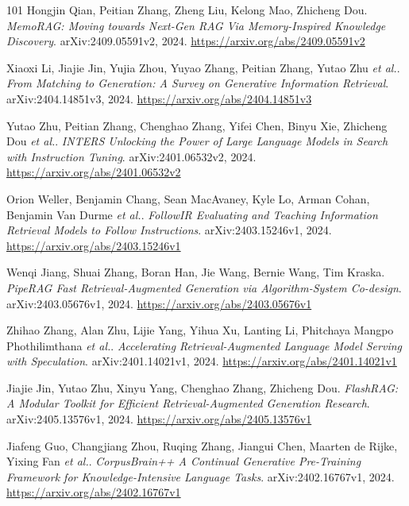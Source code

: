 \documentclass[11pt,a4paper]{article}
\begin{document}
\begin{thebibliography}{101}
Hongjin Qian, Peitian Zhang, Zheng Liu, Kelong Mao, Zhicheng Dou.
\newblock \emph{MemoRAG: Moving towards Next-Gen RAG Via Memory-Inspired Knowledge Discovery}.
\newblock arXiv:2409.05591v2, 2024.
\newblock \url{https://arxiv.org/abs/2409.05591v2}

Xiaoxi Li, Jiajie Jin, Yujia Zhou, Yuyao Zhang, Peitian Zhang, Yutao Zhu \emph{et al.}.
\newblock \emph{From Matching to Generation: A Survey on Generative Information Retrieval}.
\newblock arXiv:2404.14851v3, 2024.
\newblock \url{https://arxiv.org/abs/2404.14851v3}

Yutao Zhu, Peitian Zhang, Chenghao Zhang, Yifei Chen, Binyu Xie, Zhicheng Dou \emph{et al.}.
\newblock \emph{INTERS Unlocking the Power of Large Language Models in Search with Instruction Tuning}.
\newblock arXiv:2401.06532v2, 2024.
\newblock \url{https://arxiv.org/abs/2401.06532v2}

Orion Weller, Benjamin Chang, Sean MacAvaney, Kyle Lo, Arman Cohan, Benjamin Van Durme \emph{et al.}.
\newblock \emph{FollowIR Evaluating and Teaching Information Retrieval Models to Follow Instructions}.
\newblock arXiv:2403.15246v1, 2024.
\newblock \url{https://arxiv.org/abs/2403.15246v1}

Wenqi Jiang, Shuai Zhang, Boran Han, Jie Wang, Bernie Wang, Tim Kraska.
\newblock \emph{PipeRAG Fast Retrieval-Augmented Generation via Algorithm-System Co-design}.
\newblock arXiv:2403.05676v1, 2024.
\newblock \url{https://arxiv.org/abs/2403.05676v1}

Zhihao Zhang, Alan Zhu, Lijie Yang, Yihua Xu, Lanting Li, Phitchaya Mangpo Phothilimthana \emph{et al.}.
\newblock \emph{Accelerating Retrieval-Augmented Language Model Serving with Speculation}.
\newblock arXiv:2401.14021v1, 2024.
\newblock \url{https://arxiv.org/abs/2401.14021v1}

Jiajie Jin, Yutao Zhu, Xinyu Yang, Chenghao Zhang, Zhicheng Dou.
\newblock \emph{FlashRAG: A Modular Toolkit for Efficient Retrieval-Augmented Generation Research}.
\newblock arXiv:2405.13576v1, 2024.
\newblock \url{https://arxiv.org/abs/2405.13576v1}

Jiafeng Guo, Changjiang Zhou, Ruqing Zhang, Jiangui Chen, Maarten de Rijke, Yixing Fan \emph{et al.}.
\newblock \emph{CorpusBrain++ A Continual Generative Pre-Training Framework for Knowledge-Intensive Language Tasks}.
\newblock arXiv:2402.16767v1, 2024.
\newblock \url{https://arxiv.org/abs/2402.16767v1}


\end{thebibliography}
\end{document}

